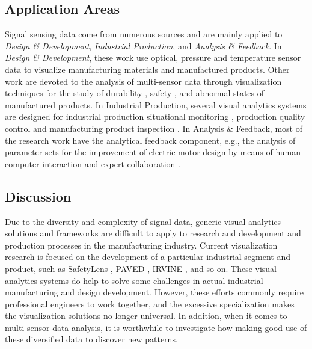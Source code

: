 \documentclass[a4paper,fleqn]{cas-dc}
\begin{document}
\subsection{Application Areas}
Signal sensing data come from numerous sources and are mainly applied to \textit{Design \& Development}, \textit{Industrial Production}, and \textit{Analysis \& Feedback}.
In \textit{Design \& Development}, these work \cite{Huettenberger2015, Suzuki2020, Zappulla2019} use optical, pressure and temperature sensor data to visualize manufacturing materials and manufactured products. Other work are devoted to the analysis of multi-sensor data through visualization techniques for the study of durability \cite{zhao2019visual}, safety \cite{narechania2020safetylens}, and abnormal states \cite{eirich2021irvine} of manufactured products.
In Industrial Production, several visual analytics systems are designed for industrial production situational monitoring \cite{Zhou2018}, production quality control \cite{Huettenberger2015} and manufacturing product inspection \cite{eirich2021irvine}.
In Analysis \& Feedback, most of the research work have the analytical feedback component, e.g., the analysis of parameter sets for the improvement of electric motor design by means of human-computer interaction and expert collaboration \cite{cibulski2020paved}.


\subsection{Discussion}
Due to the diversity and complexity of signal data, generic visual analytics solutions and frameworks are difficult to apply to research and development and production processes in the manufacturing industry.
Current visualization research is focused on the development of a particular industrial segment and product, such as SafetyLens \cite{narechania2020safetylens}, PAVED \cite{cibulski2020paved}, IRVINE \cite{eirich2021irvine}, and so on. These visual analytics systems do help to solve some challenges in actual industrial manufacturing and design development. However, these efforts commonly require professional engineers to work together, and the excessive specialization makes the visualization solutions no longer universal. In addition, when it comes to multi-sensor data analysis, it is worthwhile to investigate how making good use of these diversified data to discover new patterns. 
\end{document}
